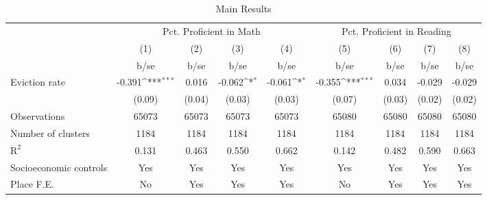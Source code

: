 \begin{table}[htbp]\centering
\def\sym#1{\ifmmode^{#1}\else\(^{#1}\)\fi}
\caption{Main Results}
\begin{tabular}{l*{8}{c}}
\toprule
                    &\multicolumn{4}{c}{Pct. Proficient in Math}                                            &\multicolumn{4}{c}{Pct. Proficient in Reading}                                         \\\cmidrule(lr){2-5}\cmidrule(lr){6-9}
                    &\multicolumn{1}{c}{(1)}         &\multicolumn{1}{c}{(2)}         &\multicolumn{1}{c}{(3)}         &\multicolumn{1}{c}{(4)}         &\multicolumn{1}{c}{(5)}         &\multicolumn{1}{c}{(6)}         &\multicolumn{1}{c}{(7)}         &\multicolumn{1}{c}{(8)}         \\
                    &        b/se         &        b/se         &        b/se         &        b/se         &        b/se         &        b/se         &        b/se         &        b/se         \\
\midrule
Eviction rate       &      -0.391\sym{***}&       0.016         &      -0.062\sym{*}  &      -0.061\sym{*}  &      -0.355\sym{***}&       0.034         &      -0.029         &      -0.029         \\
                    &      (0.09)         &      (0.04)         &      (0.03)         &      (0.03)         &      (0.07)         &      (0.03)         &      (0.02)         &      (0.02)         \\
\midrule
Observations        &       65073         &       65073         &       65073         &       65073         &       65080         &       65080         &       65080         &       65080         \\
Number of clusters  &        1184         &        1184         &        1184         &        1184         &        1184         &        1184         &        1184         &        1184         \\
$\text{R}^2$        &       0.131         &       0.463         &       0.550         &       0.662         &       0.142         &       0.482         &       0.590         &       0.663         \\
Socioeconomic controls&         Yes         &         Yes         &         Yes         &         Yes         &         Yes         &         Yes         &         Yes         &         Yes         \\
Place F.E.          &          No         &         Yes         &         Yes         &         Yes         &          No         &         Yes         &         Yes         &         Yes         \\

\end{tabular}
\end{table}
